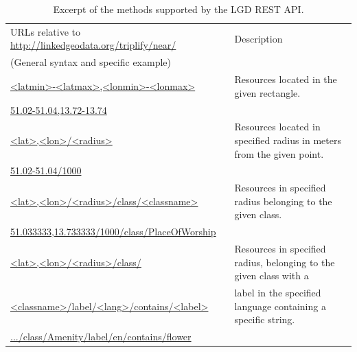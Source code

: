 \begin{table}[htb]
\begin{tabular}{ll}
\toprule
URLs relative to \url{http://linkedgeodata.org/triplify/near/} & Description \\
(General syntax and specific example) \\
\midrule
\url{<latmin>-<latmax>,<lonmin>-<lonmax>} & Resources located in the given rectangle. \\
\url{51.02-51.04,13.72-13.74}  \\
\url{<lat>,<lon>/<radius>} & Resources located in specified radius in meters from the given point. \\
\url{51.02-51.04/1000}  \\
\url{<lat>,<lon>/<radius>/class/<classname>} & Resources in specified radius belonging to the given class. \\
\url{51.033333,13.733333/1000/class/PlaceOfWorship} \\
\url{<lat>,<lon>/<radius>/class/} & Resources in specified radius, belonging to the given class with a \\
\url{<classname>/label/<lang>/contains/<label>} & label in the specified language containing a specific string. \\
\url{.../class/Amenity/label/en/contains/flower} \\ 
\bottomrule
\end{tabular}
\caption{Excerpt of the methods supported by the LGD REST API.}
\label{tab:rest-api-methods}
\end{table}

